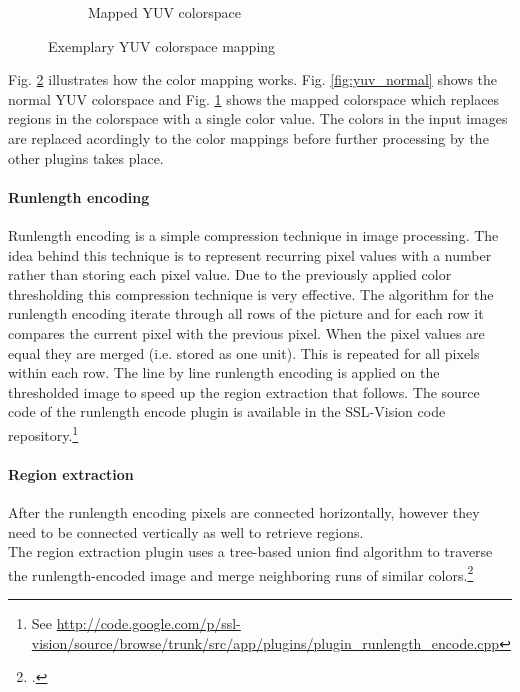 \begin{savenotes}
\begin{figure}
\begin{subfigure}[b]{0.3\textwidth}
                \caption{Mapped YUV colorspace}
                \label{fig:yuv_mapped}
        \end{subfigure}

        \caption{Exemplary YUV colorspace mapping}\label{fig:yuv}
\end{figure}
\end{savenotes}

Fig. \ref{fig:yuv} illustrates how the color mapping works. Fig.
\ref{fig:yuv_normal} shows the normal YUV colorspace and Fig.
\ref{fig:yuv_mapped} shows the mapped colorspace which replaces regions in the
colorspace with a single color value. The colors in the input images are
replaced acordingly to the color mappings before further processing by the other
plugins takes place.


\paragraph{Runlength encoding}

Runlength encoding is a simple compression technique in image processing. The
idea behind this technique is to represent recurring pixel values with a number
rather than storing each pixel value. Due to the previously applied color thresholding
this compression technique is very effective.
The algorithm for the runlength encoding iterate through all rows of the picture
and for each row it compares the current pixel with the previous pixel. When the pixel values are
equal they are merged (i.e. stored as one unit). This is repeated for all pixels within each row.
The line by line runlength encoding is applied on the thresholded image to speed up the
region extraction that follows.
The source code of the runlength encode plugin is available in the SSL-Vision code 
repository.\footnote{See \url{http://code.google.com/p/ssl-vision/source/browse/trunk/src/app/plugins/plugin_runlength_encode.cpp}}

\paragraph{Region extraction}
After the runlength encoding pixels are connected horizontally, however they
need to be connected vertically as well to retrieve regions.\\
The region extraction plugin uses a tree-based union find algorithm to traverse the
runlength-encoded image and merge neighboring runs of similar colors.\footcite[Cf.][p. 6 et sq.]{zickler_ssl_vision}

